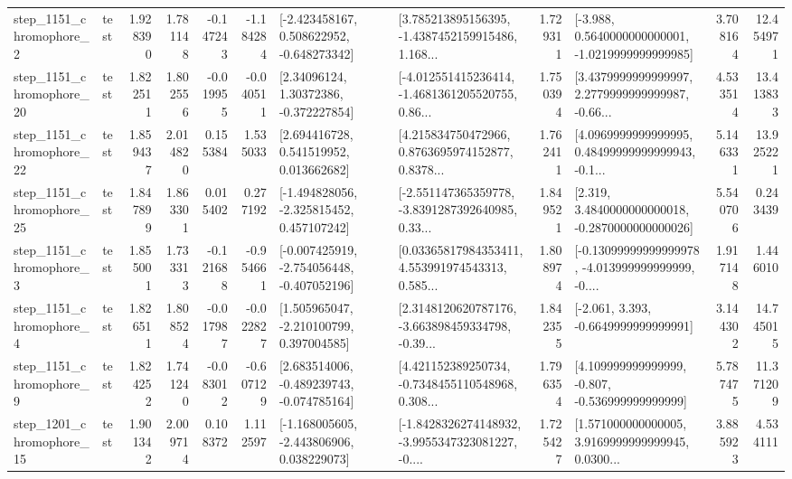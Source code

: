 \begin{tabular}{llrrrrllrlrr}
  step\_1151\_chromophore\_2 &      test &      1.928390 &    1.781148 &     -0.147243 & -1.184284 &   [-2.423458167, 0.508622952, -0.648273342] &  [3.785213895156395, -1.4387452159915486, 1.168... &       1.729311 &  [-3.988, 0.5640000000000001, -1.0219999999999985] &            3.708164 &         12.454971 \\
 step\_1151\_chromophore\_20 &      test &      1.822511 &    1.802556 &     -0.019955 & -0.040511 &      [2.34096124, 1.30372386, -0.372227854] &  [-4.012551415236414, -1.4681361205520755, 0.86... &       1.750394 &  [3.4379999999999997, 2.2779999999999987, -0.66... &            4.533514 &         13.413833 \\
 step\_1151\_chromophore\_22 &      test &      1.859437 &    2.014820 &      0.155384 &  1.535033 &     [2.694416728, 0.541519952, 0.013662682] &  [4.215834750472966, 0.8763695974152877, 0.8378... &       1.762411 &  [4.0969999999999995, 0.48499999999999943, -0.1... &            5.146331 &         13.925221 \\
 step\_1151\_chromophore\_25 &      test &      1.847899 &    1.863301 &      0.015402 &  0.277192 &   [-1.494828056, -2.325815452, 0.457107242] &  [-2.551147365359778, -3.8391287392640985, 0.33... &       1.849521 &   [2.319, 3.4840000000000018, -0.2870000000000026] &            5.540706 &          0.243439 \\
  step\_1151\_chromophore\_3 &      test &      1.855001 &    1.733313 &     -0.121688 & -0.954661 &  [-0.007425919, -2.754056448, -0.407052196] &  [0.03365817984353411, 4.553991974543313, 0.585... &       1.808974 &  [-0.13099999999999978, -4.013999999999999, -0.... &            1.917148 &          1.446010 \\
  step\_1151\_chromophore\_4 &      test &      1.826511 &    1.808524 &     -0.017987 & -0.022827 &    [1.505965047, -2.210100799, 0.397004585] &  [2.3148120620787176, -3.663898459334798, -0.39... &       1.842355 &               [-2.061, 3.393, -0.6649999999999991] &            3.144302 &         14.745015 \\
  step\_1151\_chromophore\_9 &      test &      1.824252 &    1.741240 &     -0.083012 & -0.607129 &   [2.683514006, -0.489239743, -0.074785164] &  [4.421152389250734, -0.7348455110548968, 0.308... &       1.796354 &    [4.109999999999999, -0.807, -0.536999999999999] &            5.787475 &         11.371209 \\
 step\_1201\_chromophore\_15 &      test &      1.901342 &    2.009714 &      0.108372 &  1.112597 &   [-1.168005605, -2.443806906, 0.038229073] &  [-1.8428326274148932, -3.9955347323081227, -0.... &       1.725427 &  [1.571000000000005, 3.9169999999999945, 0.0300... &            3.885923 &          4.534111 \\

\end{tabular}
